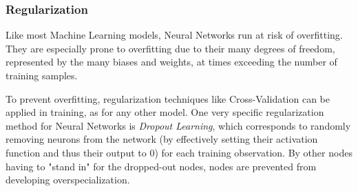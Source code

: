  \subsubsection{Regularization}
 
 Like most Machine Learning models, Neural Networks run at risk of overfitting. They are especially prone to overfitting due to their many degrees of freedom, represented by the many biases and weights, at times exceeding the number of training samples.

 To prevent overfitting, regularization techniques like Cross-Validation can be applied in training, as for any other model. One very specific regularization method for Neural Networks is \textit{Dropout Learning}, which corresponds to randomly removing neurons from the network (by effectively setting their activation function and thus their output to 0) for each training observation. By other nodes having to "stand in" for the dropped-out nodes, nodes are prevented from developing overspecialization. \cite{James2023}

%
%
%
%


